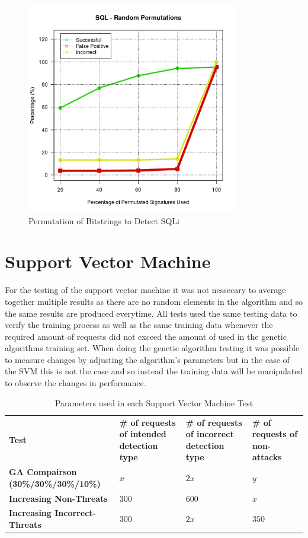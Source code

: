 \begin{figure}[hb]
	\centering
	\includegraphics[width=350px]{./assets/results/rand/Results_SQL.png}
	\caption{Permutation of Bitstrings to Detect SQLi}
	\label{fig:resRand}
\end{figure}

\section{Support Vector Machine}

For the testing of the support vector machine it was not nessecary to average together multiple results as there are no random elements in the algorithm and so the same results are produced everytime.  All tests used the same testing data to verify the training process as well as the same training data whenever the required amount of requests did not exceed the amount of used in the genetic algorithms training set.  When doing the genetic algorithm testing it was possible to measure changes by adjusting the algorithm's parameters but in the case of the SVM this is not the case and so instead the training data will be manipulated to observe the changes in performance.

\begin{table}
	\begin{tabular}{|p{2.0in}|p{1.125in}|p{1.125in}|p{1.125in}|}
	\hline
	\textbf{Test} & \textbf{\# of requests of intended detection type} & \textbf{\# of requests of incorrect detection type} & \textbf{\# of requests of non-attacks} \\ 
	\hhline{|=|=|=|=|}
	\textbf{GA Compairson (30\%/30\%/30\%/10\%)} & \textbf{$x$} & \textbf{$2x$} & \textbf{$y$} \\
	\hline
	\textbf{Increasing Non-Threats} & 300 & 600 & \textbf{$x$} \\
	\hline
	\textbf{Increasing Incorrect-Threats} & 300 & \textbf{$2x$} & 350 \\
	\hline
	\end{tabular}
	\caption{Parameters used in each Support Vector Machine Test}
	\label{tab:svmTestParameters}
\end{table}

